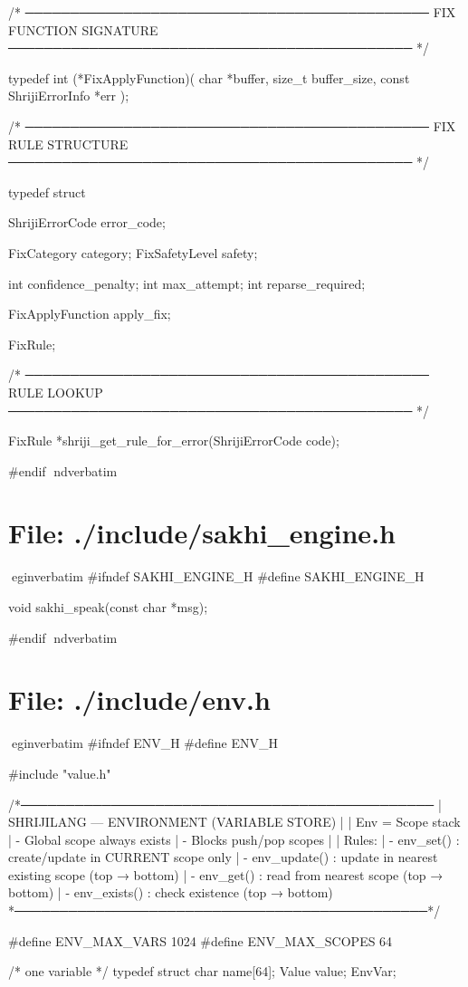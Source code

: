 \documentclass{article}
\begin{document}
/* ─────────────────────────────────────────────
   FIX FUNCTION SIGNATURE
───────────────────────────────────────────── */

typedef int (*FixApplyFunction)(
    char *buffer,
    size_t buffer_size,
    const ShrijiErrorInfo *err
);

/* ─────────────────────────────────────────────
   FIX RULE STRUCTURE
───────────────────────────────────────────── */

typedef struct {

    ShrijiErrorCode error_code;

    FixCategory category;
    FixSafetyLevel safety;

    int confidence_penalty;
    int max_attempt;
    int reparse_required;

    FixApplyFunction apply_fix;

} FixRule;

/* ─────────────────────────────────────────────
   RULE LOOKUP
───────────────────────────────────────────── */

FixRule *shriji_get_rule_for_error(ShrijiErrorCode code);

#endif
nd{verbatim}
\section*{File: ./include/sakhi_engine.h}
egin{verbatim}
#ifndef SAKHI_ENGINE_H
#define SAKHI_ENGINE_H

void sakhi_speak(const char *msg);

#endif
nd{verbatim}
\section*{File: ./include/env.h}
egin{verbatim}
#ifndef ENV_H
#define ENV_H

#include "value.h"

/*──────────────────────────────────────────────
 | SHRIJILANG — ENVIRONMENT (VARIABLE STORE)
 |
 | Env = Scope stack
 |  - Global scope always exists
 |  - Blocks { } push/pop scopes
 |
 | Rules:
 |  - env_set()     : create/update in CURRENT scope only
 |  - env_update()  : update in nearest existing scope (top → bottom)
 |  - env_get()     : read from nearest scope (top → bottom)
 |  - env_exists()  : check existence (top → bottom)
 *──────────────────────────────────────────────*/

#define ENV_MAX_VARS     1024
#define ENV_MAX_SCOPES   64

/* one variable */
typedef struct {
    char name[64];
    Value value;
} EnvVar;
\end{document}
